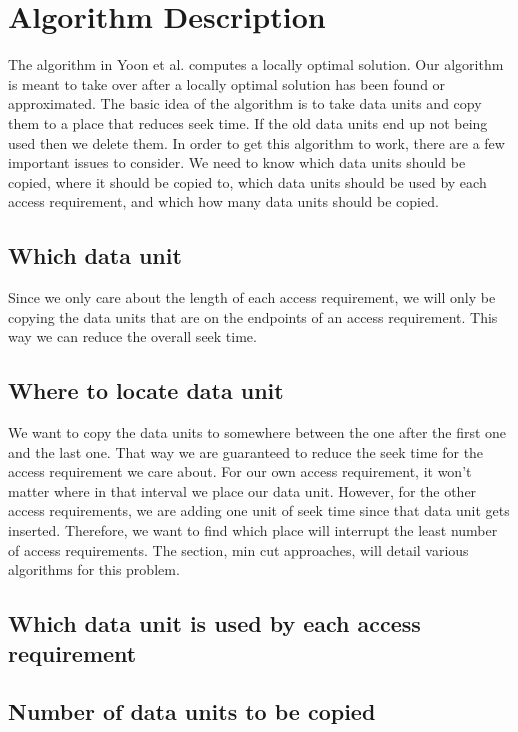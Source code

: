 \documentclass[11pt,psfig]{article}
\begin{document}
\section*{Algorithm Description}

The algorithm in Yoon et al. computes a locally optimal solution. Our algorithm is meant to take over after a locally optimal solution has been found or approximated. The basic idea of the algorithm is to take data units and copy them to a place that reduces seek time. If the old data units end up not being used then we delete them. In order to get this algorithm to work, there are a few important issues to consider. We need to know which data units should be copied, where it should be copied to, which data units should be used by each access requirement, and which how many data units should be copied. 

\subsection*{Which data unit}

Since we only care about the length of each access requirement, we will only be copying the data units that are on the endpoints of an access requirement. This way we can reduce the overall seek time.

\subsection*{Where to locate data unit}

We want to copy the data units to somewhere between the one after the first one and the last one. That way we are guaranteed to reduce the seek time for the access requirement we care about. For our own access requirement, it won't matter where in that interval we place our data unit. However, for the other access requirements, we are adding one unit of seek time since that data unit gets inserted. Therefore, we want to find which place will interrupt the least number of access requirements. The section, min cut approaches, will detail various algorithms for this problem. 

\subsection*{Which data unit is used by each access requirement}



\subsection*{Number of data units to be copied} 
\end{document}
